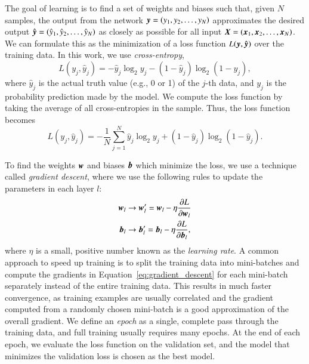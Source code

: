 \documentclass[fleqn,usenatbib]{mnras}
\newcommand{\eg}{{e.g., }}
\begin{document}
The goal of learning is to find a set of weights and biases such that,
given $N$ samples, the output from the network
$\bmath{y}=\left(y_1, y_2, \dots, y_N \right)$
approximates the desired output
$\hat{\bmath{y}}=\left(\hat{y}_1, \hat{y}_2, \dots, \hat{y}_N \right)$
as closely as possible for all input
$\bmath{X}=\left(\bmath{x}_1,\bmath{x}_2,\dots,\bmath{x}_N\right)$.
We can formulate this as the minimization of a loss function
$L(\bmath{y},\hat{\bmath{y}})$
over the training data.
In this work, we use \textit{cross-entropy},
\begin{equation}
  L(y_j, \hat{y}_j) = -\hat{y}_j \log_2 y_j - (1 - \hat{y}_j) \log_2(1 - y_j),
  \label{eq:cross_entropy}
\end{equation}
where $\hat{y}_j$ is the actual truth value (\eg 0 or 1) of the $j$-th data, and
$y_j$ is the probability prediction made by the model.
We compute the loss function by taking the average of all cross-entropies in the sample.
Thus, the loss function becomes
\begin{equation}
  L(y_j, \hat{y}_j) = - \frac{1}{N} \sum_{j=1}^{N} \hat{y}_j  \log_2 y_j
    + (1 - \hat{y}_j)  \log_2 (1 - \hat y_j).
  \label{eq:cross_entropy_all}
\end{equation}

To find the weights $\bmath{w}$ and biases $\bmath{b}$ which minimize the loss,
we use a technique called \textit{gradient descent},
where we use the following rules to update the parameters in each layer $l$:
\begin{align}
  \bmath{w}_l &\rightarrow
  \bmath{w}_l^{\prime}
  = \bmath{w}_l - \eta \frac{\partial L}{\partial \bmath{w}_l} \nonumber \\
  \bmath{b}_l &\rightarrow
  \bmath{b}_l^{\prime}
  = \bmath{b}_l - \eta \frac{\partial L}{\partial \bmath{b}_l},
  \label{eq:gradient_descent}
\end{align}
where $\eta$ is a small, positive number known as the \textit{learning rate}.
A common approach to speed up training is to split the training data
into mini-batches and compute the gradients in
Equation~\ref{eq:gradient_descent} for each mini-batch separately instead of
the entire training data.
This results in much faster convergence, as training examples are usually correlated
and the gradient computed from a randomly chosen mini-batch is a good approximation
of the overall gradient.
We define an \textit{epoch} as a single, complete pass through the training data,
and full training usually requires many epochs.
At the end of each epoch, we evaluate the loss function on the validation set,
and the model that minimizes the validation loss is chosen as the best model.
\end{document}
